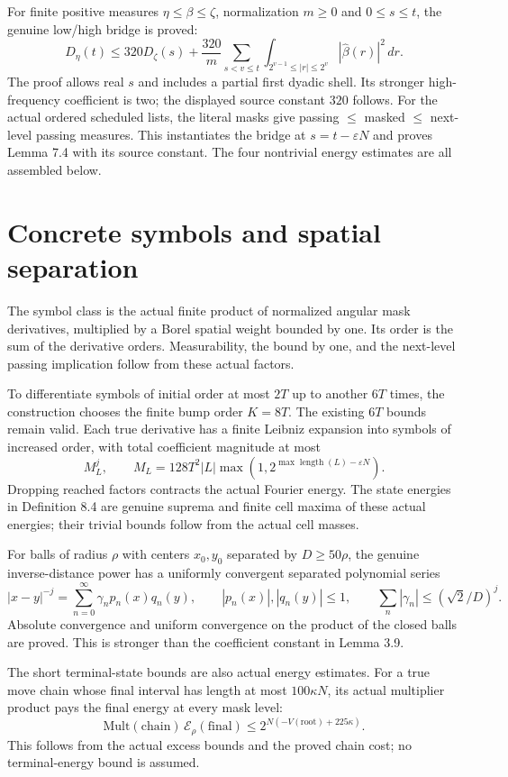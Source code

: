 \documentclass[11pt]{article}
\begin{document}
For finite positive measures $\eta\le\beta\le\zeta$, normalization $m\ge0$
and $0\le s\le t$, the genuine low/high bridge is proved:
\[
D_\eta(t)\le320D_\zeta(s)
 +\frac{320}{m}\sum_{s<v\le t}
 \int_{2^{v-1}\le|r|\le2^v}|\widehat\beta(r)|^2\,dr.
\]
The proof allows real $s$ and includes a partial first dyadic shell. Its
stronger high-frequency coefficient is two; the displayed source constant
$320$ follows. For the actual ordered scheduled lists, the literal masks give
passing $\le$ masked $\le$ next-level passing measures. This instantiates the
bridge at $s=t-\varepsilon N$ and proves Lemma 7.4 with its source constant.
The four nontrivial energy estimates are all assembled below.

\newpage
\section*{Concrete symbols and spatial separation}
The symbol class is the actual finite product of normalized angular mask
derivatives, multiplied by a Borel spatial weight bounded by one. Its order
is the sum of the derivative orders. Measurability, the bound by one, and the
next-level passing implication follow from these actual factors.

To differentiate symbols of initial order at most $2T$ up to another $6T$ times,
the construction chooses the finite bump order $K=8T$. The existing $6T$ bounds
remain valid. Each true derivative has a finite Leibniz expansion into symbols
of increased order, with total coefficient magnitude at most
\[
M_L^j,\qquad M_L=128T^2|L|\max(1,2^{\max\operatorname{length}(L)-\varepsilon N}).
\]
Dropping reached factors contracts the actual Fourier energy. The state
energies in Definition 8.4 are genuine suprema and finite cell maxima of these
actual energies; their trivial bounds follow from the actual cell masses.

For balls of radius $\rho$ with centers $x_0,y_0$ separated by $D\ge50\rho$, the
genuine inverse-distance power has a uniformly convergent separated polynomial series
\[
|x-y|^{-j}=\sum_{n=0}^{\infty}\gamma_n p_n(x)q_n(y),\qquad
|p_n(x)|,|q_n(y)|\le1,\qquad
\sum_n|\gamma_n|\le(\sqrt2/D)^j.
\]
Absolute convergence and uniform convergence on the product of the closed
balls are proved. This is stronger than the coefficient constant in Lemma 3.9.

The short terminal-state bounds are also actual energy estimates. For a true
move chain whose final interval has length at most $100\kappa N$, its actual
multiplier product pays the final energy at every mask level:
\[
\mathrm{Mult}(\mathrm{chain})\,\mathcal E_\rho(\mathrm{final})
\le2^{N(-V(\mathrm{root})+225\kappa)}.
\]
This follows from the actual excess bounds and the proved chain cost; no
terminal-energy bound is assumed.
\end{document}
